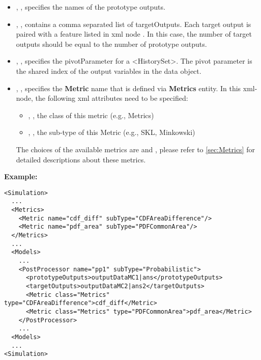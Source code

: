 %
%

\begin{itemize}
  \item {}, , specifies the names of the prototype outputs.
  \item {}, , contains a comma separated list of
    targetOutputs. \nb Each target output is paired with a feature listed in xml node . In this case, the
    number of target outputs should be equal to the number of prototype outputs.
  \item {}, , specifies the pivotParameter for a <HistorySet>.
    The pivot parameter is the shared index of the output variables in the data object.
  \item {}, , specifies the \textbf{Metric} name that is defined via
    \textbf{Metrics} entity. In this xml-node, the following xml attributes need to be specified:
    \begin{itemize}
      \item {}, , the class of this metric (e.g., Metrics)
      \item {}, , the sub-type of this Metric (e.g., SKL, Minkowski)
    \end{itemize}
    \nb The choices of the available metrics are  and , please
    refer to \ref{sec:Metrics} for detailed descriptions about these metrics.
\end{itemize}

\textbf{Example:}
\begin{lstlisting}[style=XML,morekeywords={subType}]
<Simulation>
  ...
  <Metrics>
    <Metric name="cdf_diff" subType="CDFAreaDifference"/>
    <Metric name="pdf_area" subType="PDFCommonArea"/>
  </Metrics>
  ...
  <Models>
    ...
    <PostProcessor name="pp1" subType="Probabilistic">
      <prototypeOutputs>outputDataMC1|ans</prototypeOutputs>
      <targetOutputs>outputDataMC2|ans2</targetOutputs>
      <Metric class="Metrics" type="CDFAreaDifference">cdf_diff</Metric>
      <Metric class="Metrics" type="PDFCommonArea">pdf_area</Metric>
    </PostProcessor>
    ...
  <Models>
  ...
<Simulation>
\end{lstlisting}

